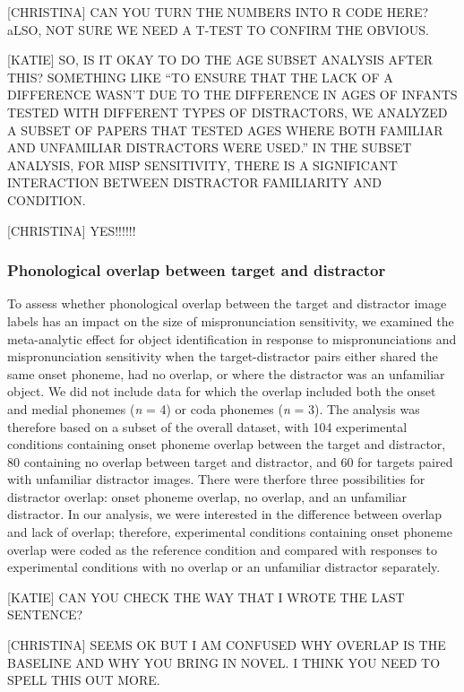 \documentclass[man]{apa6}
\theoremstyle{definition}
\theoremstyle{definition}
\theoremstyle{definition}
\theoremstyle{remark}
\begin{document}
{[}CHRISTINA{]} CAN YOU TURN THE NUMBERS INTO R CODE HERE? aLSO, NOT
SURE WE NEED A T-TEST TO CONFIRM THE OBVIOUS.

{[}KATIE{]} SO, IS IT OKAY TO DO THE AGE SUBSET ANALYSIS AFTER THIS?
SOMETHING LIKE \enquote{TO ENSURE THAT THE LACK OF A DIFFERENCE WASN'T
DUE TO THE DIFFERENCE IN AGES OF INFANTS TESTED WITH DIFFERENT TYPES OF
DISTRACTORS, WE ANALYZED A SUBSET OF PAPERS THAT TESTED AGES WHERE BOTH
FAMILIAR AND UNFAMILIAR DISTRACTORS WERE USED.} IN THE SUBSET ANALYSIS,
FOR MISP SENSITIVITY, THERE IS A SIGNIFICANT INTERACTION BETWEEN
DISTRACTOR FAMILIARITY AND CONDITION.

{[}CHRISTINA{]} YES!!!!!!

\subsubsection{Phonological overlap between target and
distractor}\label{phonological-overlap-between-target-and-distractor}

To assess whether phonological overlap between the target and distractor
image labels has an impact on the size of mispronunciation sensitivity,
we examined the meta-analytic effect for object identification in
response to mispronunciations and mispronunciation sensitivity when the
target-distractor pairs either shared the same onset phoneme, had no
overlap, or where the distractor was an unfamiliar object. We did not
include data for which the overlap included both the onset and medial
phonemes (\emph{n} = 4) or coda phonemes (\emph{n} = 3). The analysis
was therefore based on a subset of the overall dataset, with 104
experimental conditions containing onset phoneme overlap between the
target and distractor, 80 containing no overlap between target and
distractor, and 60 for targets paired with unfamiliar distractor images.
There were therfore three possibilities for distractor overlap: onset
phoneme overlap, no overlap, and an unfamiliar distractor. In our
analysis, we were interested in the difference between overlap and lack
of overlap; therefore, experimental conditions containing onset phoneme
overlap were coded as the reference condition and compared with
responses to experimental conditions with no overlap or an unfamiliar
distractor separately.

{[}KATIE{]} CAN YOU CHECK THE WAY THAT I WROTE THE LAST SENTENCE?

{[}CHRISTINA{]} SEEMS OK BUT I AM CONFUSED WHY OVERLAP IS THE BASELINE
AND WHY YOU BRING IN NOVEL. I THINK YOU NEED TO SPELL THIS OUT MORE.
\end{document}
